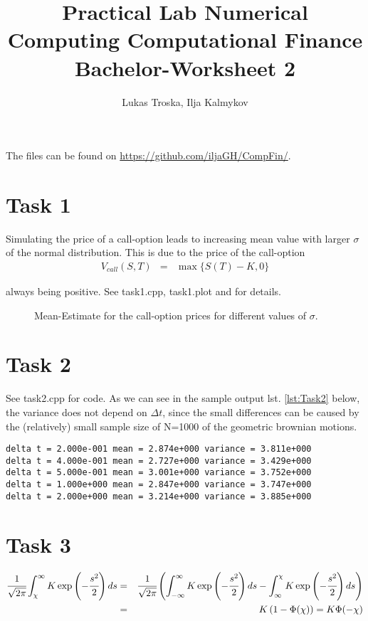 \documentclass[]{article}
\title{Practical Lab Numerical Computing Computational Finance \\Bachelor-Worksheet 2}
\author{Lukas Troska, Ilja Kalmykov}
\date{}
\begin{document}
\maketitle 

The files can be found on \url{https://github.com/iljaGH/CompFin/}.

\section*{Task 1} Simulating the price of a call-option leads to
increasing mean value with larger $\sigma$ of the normal distribution. This is
due to the price of the call-option
\begin{eqnarray*}
V_{call}\left(S,T\right) & = &\max \lbrace S(T)-K,0 \rbrace
\end{eqnarray*}

always being positive. See task1.cpp,
task1.plot and  for details.
\begin{figure}[!ht]

\caption{Mean-Estimate for the call-option prices for different values of
$\sigma$.}
\label{fig:Task1}
\end{figure}


\section*{Task 2} See task2.cpp for code. As we can see in the sample output
lst. \ref{lst:Task2} below, the variance does not depend on $\Delta t$, since the
small differences can be caused by the (relatively) small sample size of N=1000
of the geometric brownian motions.
\begin{lstlisting}[caption = estimated $\mu$ and $\sigma$ for
different values of $\Delta t$ and N = 1.0E3, captionpos=b, label=lst:Task2] 
delta t = 2.000e-001 mean = 2.874e+000 variance = 3.811e+000
delta t = 4.000e-001 mean = 2.727e+000 variance = 3.429e+000
delta t = 5.000e-001 mean = 3.001e+000 variance = 3.752e+000
delta t = 1.000e+000 mean = 2.847e+000 variance = 3.747e+000
delta t = 2.000e+000 mean = 3.214e+000 variance = 3.885e+000
\end{lstlisting}

\section*{Task 3}
\begin{eqnarray*}
\cfrac{1}{\sqrt{2\pi}}\int_{\chi}^{\infty}K\exp\left(-\cfrac{s^2}{2}\right)ds &
= & \cfrac{1}{\sqrt{2\pi}}\left(\int_{-\infty}^{\infty}K\exp\left(-\cfrac{s^2}{2}\right)ds
- \int_{\infty}^{\chi}K\exp\left(-\cfrac{s^2}{2}\right)ds \right) \\
& = & K\left(1 - \Phi(\chi)\right) = K \Phi(-\chi)
\end{eqnarray*}
\end{document}
